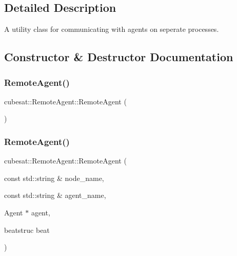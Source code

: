 \subsection{Detailed Description}
A utility class for communicating with agents on seperate processes. 

\subsection{Constructor \& Destructor Documentation}
\mbox{\label{classcubesat_1_1RemoteAgent_a011f3eddd537166c854dc976f6e04f9b}} 
\subsubsection{\texorpdfstring{Remote\+Agent()}{RemoteAgent()}\hspace{0.1cm}{\footnotesize\ttfamily [1/2]}}
{\footnotesize\ttfamily cubesat\+::\+Remote\+Agent\+::\+Remote\+Agent (\begin{DoxyParamCaption}{ }\end{DoxyParamCaption})\hspace{0.3cm}{\ttfamily [inline]}}

\mbox{\label{classcubesat_1_1RemoteAgent_a415c6e6434cbc15c3e0b889c02efbe0a}} 
\subsubsection{\texorpdfstring{Remote\+Agent()}{RemoteAgent()}\hspace{0.1cm}{\footnotesize\ttfamily [2/2]}}
{\footnotesize\ttfamily cubesat\+::\+Remote\+Agent\+::\+Remote\+Agent (\begin{DoxyParamCaption}\item[{const std\+::string \&}]{node\+\_\+name,  }\item[{const std\+::string \&}]{agent\+\_\+name,  }\item[{Agent $\ast$}]{agent,  }\item[{beatstruc}]{beat }\end{DoxyParamCaption})\hspace{0.3cm}{\ttfamily [inline]}}



